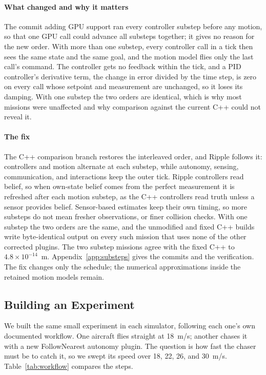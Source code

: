 \documentclass[conference]{IEEEtran}
\begin{document}
\paragraph{What changed and why it matters}
The commit adding GPU support ran every controller substep before any motion,
so that one GPU call could advance all substeps together; it gives no reason
for the new order. With more than one substep, every controller call in a tick
then sees the same state and the same goal, and the motion model flies only the
last call's command. The controller gets no feedback within the tick, and a PID
controller's derivative term, the change in error divided by the time step, is
zero on every call whose setpoint and measurement are unchanged, so it loses its
damping. With one substep
the two orders are identical, which is why most missions were unaffected and
why comparison against the current C++ could not reveal it.

\paragraph{The fix}
The C++ comparison branch restores the interleaved order, and Ripple
follows it: controllers and motion alternate at each substep, while autonomy,
sensing, communication, and interactions keep the outer tick. Ripple
controllers read belief, so when own-state belief comes from the perfect
measurement it is refreshed after each motion substep, as the C++ controllers
read truth unless a sensor provides belief. Sensor-based estimates keep their
own timing, so more substeps do not mean fresher observations, or finer
collision checks. With one substep the two orders are the same, and the
unmodified and fixed C++ builds write byte-identical output on every such
mission that uses none of the other corrected plugins. The two substep missions
agree with the fixed C++ to $4.8\times10^{-14}$~m. Appendix~\ref{app:substeps} gives
the commits and the verification. The fix changes only the schedule; the
numerical approximations inside the retained motion models remain.

\subsection{Building an Experiment}
\label{sec:workflow}

We built the same small experiment in each simulator, following each one's own
documented workflow. One aircraft flies straight at 18~m/s; another chases it
with a new FollowNearest autonomy plugin. The question is how fast the chaser
must be to catch it, so we swept its speed over 18, 22, 26, and 30~m/s.
Table~\ref{tab:workflow} compares the steps.
\end{document}
